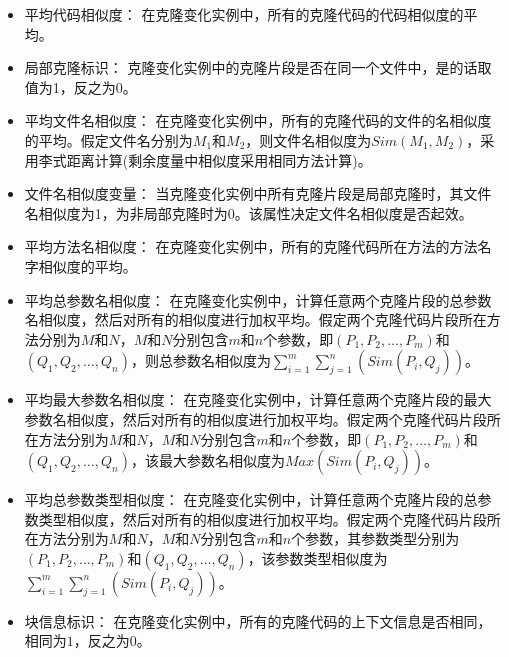 \begin{itemize}
\item
平均代码相似度：
在克隆变化实例中，所有的克隆代码的代码相似度的平均。
\item
局部克隆标识：
克隆变化实例中的克隆片段是否在同一个文件中，是的话取值为1，反之为0。
\item
平均文件名相似度：
在克隆变化实例中，所有的克隆代码的文件的名相似度的平均。假定文件名分别为$M_1$和$M_2$，则文件名相似度为$\mathit{Sim(M_1,M_2)}$，采用李式距离\cite{levenshtein1966binary}计算(剩余度量中相似度采用相同方法计算)。
\item
文件名相似度变量：
当克隆变化实例中所有克隆片段是局部克隆时，其文件名相似度为1，为非局部克隆时为0。该属性决定文件名相似度是否起效。
\item
平均方法名相似度：
在克隆变化实例中，所有的克隆代码所在方法的方法名字相似度的平均。
\item
平均总参数名相似度：
在克隆变化实例中，计算任意两个克隆片段的总参数名相似度，然后对所有的相似度进行加权平均。假定两个克隆代码片段所在方法分别为$M$和$N$，$M$和$N$分别包含$m$和$n$个参数，即$(P_1,P_2,…,P_m)$和$(Q_1,Q_2,…,Q_n)$，则总参数名相似度为$\mathit{\sum_{i=1}^m \sum_{j=1}^n (Sim(P_i,Q_j))}$。
\item
平均最大参数名相似度：
在克隆变化实例中，计算任意两个克隆片段的最大参数名相似度，然后对所有的相似度进行加权平均。假定两个克隆代码片段所在方法分别为$M$和$N$，$M$和$N$分别包含$m$和$n$个参数，即$(P_1,P_2,…,P_m)$和$(Q_1,Q_2,…,Q_n)$，该最大参数名相似度为$\mathit{Max(Sim(P_i,Q_j))}$。
\item 
平均总参数类型相似度：
在克隆变化实例中，计算任意两个克隆片段的总参数类型相似度，然后对所有的相似度进行加权平均。假定两个克隆代码片段所在方法分别为$M$和$N$，$M$和$N$分别包含$m$和$n$个参数，其参数类型分别为$(P_1,P_2,…,P_m)$和$(Q_1,Q_2,…,Q_n)$，该参数类型相似度为$\mathit{\sum_{i=1}^m \sum_{j=1}^n (Sim(P_i,Q_j))}$。
\item
块信息标识：
在克隆变化实例中，所有的克隆代码的上下文信息是否相同，相同为$1$，反之为$0$。
\end{itemize}

